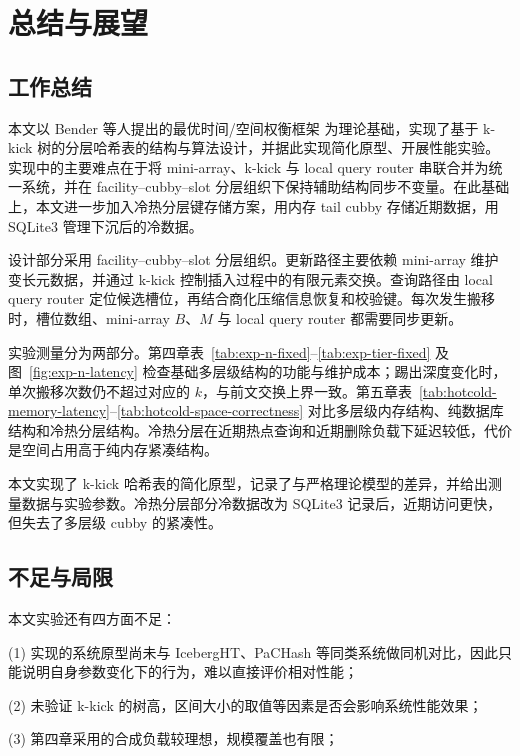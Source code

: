 \chapter{总结与展望}
\label{ch:concl}

\section{工作总结}

本文以 Bender 等人提出的最优时间/空间权衡框架\cite{bender2022otsh} 为理论基础，实现了基于 k-kick 树的分层哈希表的结构与算法设计，并据此实现简化原型、开展性能实验。实现中的主要难点在于将 mini-array、k-kick 与 local query router 串联合并为统一系统，并在 facility--cubby--slot 分层组织下保持辅助结构同步不变量。在此基础上，本文进一步加入冷热分层键存储方案，用内存 tail cubby 存储近期数据，用 SQLite3 管理下沉后的冷数据\cite{gaffney2022sqlite,dong2021rocksdb}。

设计部分采用 facility--cubby--slot 分层组织。更新路径主要依赖 mini-array 维护变长元数据，并通过 k-kick 控制插入过程中的有限元素交换。查询路径由 local query router 定位候选槽位，再结合商化压缩信息恢复和校验键。每次发生搬移时，槽位数组、mini-array \(B\)、\(M\) 与 local query router 都需要同步更新。

实验测量分为两部分。第四章表~\ref{tab:exp-n-fixed}--\ref{tab:exp-tier-fixed} 及图~\ref{fig:exp-n-latency} 检查基础多层级结构的功能与维护成本；踢出深度变化时，单次搬移次数仍不超过对应的 \(k\)，与前文交换上界一致。第五章表~\ref{tab:hotcold-memory-latency}--\ref{tab:hotcold-space-correctness} 对比多层级内存结构、纯数据库结构和冷热分层结构。冷热分层在近期热点查询和近期删除负载下延迟较低，代价是空间占用高于纯内存紧凑结构。

本文实现了 k-kick 哈希表的简化原型，记录了与严格理论模型的差异，并给出测量数据与实验参数。冷热分层部分冷数据改为 SQLite3 记录后，近期访问更快，但失去了多层级 cubby 的紧凑性。

\section{不足与局限}

本文实验还有四方面不足：

(1) 实现的系统原型尚未与 IcebergHT\cite{pandey2023iceberght}、PaCHash\cite{kurpicz2023pachash} 等同类系统做同机对比，因此只能说明自身参数变化下的行为，难以直接评价相对性能；

(2) 未验证 k-kick 的树高，区间大小的取值等因素是否会影响系统性能效果；

(3) 第四章采用的合成负载较理想，规模覆盖也有限；

